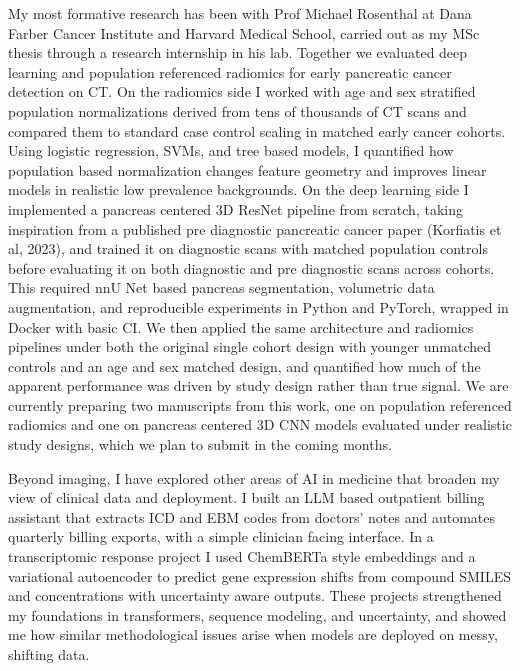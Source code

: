 \documentclass[11pt,a4paper]{article}
\begin{document}
My most formative research has been with Prof Michael Rosenthal at Dana Farber Cancer Institute and Harvard Medical School, carried out as my MSc thesis through a research internship in his lab. Together we evaluated deep learning and population referenced radiomics for early pancreatic cancer detection on CT. On the radiomics side I worked with age and sex stratified population normalizations derived from tens of thousands of CT scans and compared them to standard case control scaling in matched early cancer cohorts. Using logistic regression, SVMs, and tree based models, I quantified how population based normalization changes feature geometry and improves linear models in realistic low prevalence backgrounds. On the deep learning side I implemented a pancreas centered 3D ResNet pipeline from scratch, taking inspiration from a published pre diagnostic pancreatic cancer paper (Korfiatis et al, 2023), and trained it on diagnostic scans with matched population controls before evaluating it on both diagnostic and pre diagnostic scans across cohorts. This required nnU Net based pancreas segmentation, volumetric data augmentation, and reproducible experiments in Python and PyTorch, wrapped in Docker with basic CI. We then applied the same architecture and radiomics pipelines under both the original single cohort design with younger unmatched controls and an age and sex matched design, and quantified how much of the apparent performance was driven by study design rather than true signal. We are currently preparing two manuscripts from this work, one on population referenced radiomics and one on pancreas centered 3D CNN models evaluated under realistic study designs, which we plan to submit in the coming months.



Beyond imaging, I have explored other areas of AI in medicine that broaden my view of clinical data and deployment. I built an LLM based outpatient billing assistant that extracts ICD and EBM codes from doctors’ notes and automates quarterly billing exports, with a simple clinician facing interface. In a transcriptomic response project I used ChemBERTa style embeddings and a variational autoencoder to predict gene expression shifts from compound SMILES and concentrations with uncertainty aware outputs. These projects strengthened my foundations in transformers, sequence modeling, and uncertainty, and showed me how similar methodological issues arise when models are deployed on messy, shifting data.
\end{document}
